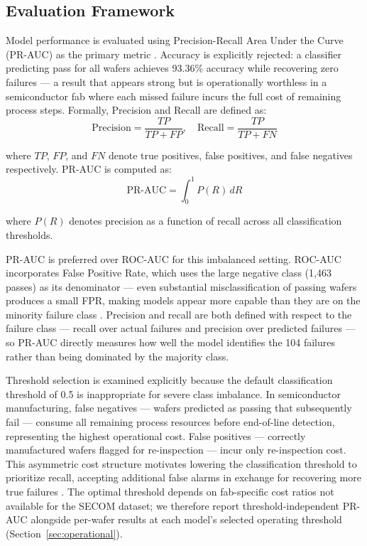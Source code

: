 \documentclass[conference]{IEEEtran}
\begin{document}
\subsection{Evaluation Framework}

Model performance is evaluated using Precision-Recall Area Under 
the Curve (PR-AUC) as the primary metric \cite{davis2006relationship}. 
Accuracy is explicitly rejected: a classifier predicting pass for 
all wafers achieves 93.36\% accuracy while recovering zero failures 
--- a result that appears strong but is operationally worthless in 
a semiconductor fab where each missed failure incurs the full cost 
of remaining process steps.
Formally, Precision and Recall are defined as:
\begin{equation}
\text{Precision} = \frac{TP}{TP + FP}, \quad 
\text{Recall} = \frac{TP}{TP + FN}
\label{eq:precision_recall}
\end{equation}

where $TP$, $FP$, and $FN$ denote true positives, false 
positives, and false negatives respectively. PR-AUC is 
computed as:
\begin{equation}
\text{PR-AUC} = \int_0^1 P(R) \, dR
\label{eq:prauc}
\end{equation}

where $P(R)$ denotes precision as a function of recall 
across all classification thresholds.

PR-AUC is preferred over ROC-AUC for this imbalanced setting. 
ROC-AUC incorporates False Positive Rate, which uses the large 
negative class (1,463 passes) as its denominator --- even 
substantial misclassification of passing wafers produces a small 
FPR, making models appear more capable than they are on the 
minority failure class \cite{davis2006relationship}. Precision and 
recall are both defined with respect to the failure class --- 
recall over actual failures and precision over predicted failures 
--- so PR-AUC directly measures how well the model identifies the 
104 failures rather than being dominated by the majority class.

Threshold selection is examined explicitly because the default 
classification threshold of 0.5 is inappropriate for severe class 
imbalance. In semiconductor manufacturing, false negatives --- 
wafers predicted as passing that subsequently fail --- consume all 
remaining process resources before end-of-line detection, 
representing the highest operational cost. False positives --- 
correctly manufactured wafers flagged for re-inspection --- incur 
only re-inspection cost. This asymmetric cost structure motivates 
lowering the classification threshold to prioritize recall, 
accepting additional false alarms in exchange for recovering more 
true failures \cite{stich2020yield}. The optimal threshold depends 
on fab-specific cost ratios not available for the SECOM dataset; 
we therefore report threshold-independent PR-AUC alongside 
per-wafer results at each model's selected operating threshold 
(Section~\ref{sec:operational}).
\end{document}
